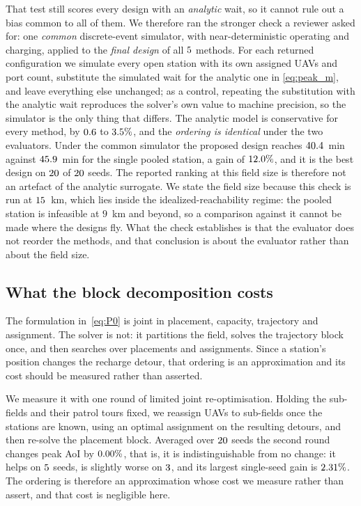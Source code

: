 That test still scores every design with an \emph{analytic} wait, so it cannot rule out
a bias common to all of them. We therefore ran the stronger check a reviewer asked for:
one \emph{common} discrete-event simulator, with near-deterministic operating and
charging, applied to the \emph{final design} of all $5$ methods. For each
returned configuration we simulate every open station with its own assigned UAVs and
port count, substitute the simulated wait for the analytic one in \eqref{eq:peak_m}, and
leave everything else unchanged; as a control, repeating the substitution with the
analytic wait reproduces the solver's own value to machine precision, so the simulator
is the only thing that differs. The analytic model is conservative for every method, by
$0.6$ to $3.5\%$, and the \emph{ordering is identical} under the two
evaluators. Under the common simulator the proposed design reaches $40.4$~min
against $45.9$~min for the single pooled station, a gain of
$12.0\%$, and it is the best design on $20$ of $20$ seeds. The
reported ranking at this field size is therefore not an artefact of the analytic
surrogate. We state the field size because this check is run at $15$~km, which lies
inside the idealized-reachability regime: the pooled station is infeasible at $9$~km and
beyond, so a comparison against it cannot be made where the designs fly. What the check
establishes is that the evaluator does not reorder the methods, and that conclusion is
about the evaluator rather than about the field size.

\subsection{What the block decomposition costs}
\label{sec:joint-cost}

The formulation in~\eqref{eq:P0} is joint in placement, capacity, trajectory and
assignment. The solver is not: it partitions the field, solves the trajectory block
once, and then searches over placements and assignments. Since a station's position
changes the recharge detour, that ordering is an approximation and its cost should be
measured rather than asserted.

We measure it with one round of limited joint re-optimisation. Holding the sub-fields
and their patrol tours fixed, we reassign UAVs to sub-fields once the stations are
known, using an optimal assignment on the resulting detours, and then re-solve the
placement block. Averaged over $20$ seeds the second round changes peak AoI by
$0.00\%$, that is, it is indistinguishable from no change: it helps on
$5$ seeds, is slightly worse on $3$, and its largest
single-seed gain is $2.31\%$. The ordering is therefore an approximation whose
cost we measure rather than assert, and that cost is negligible here.

